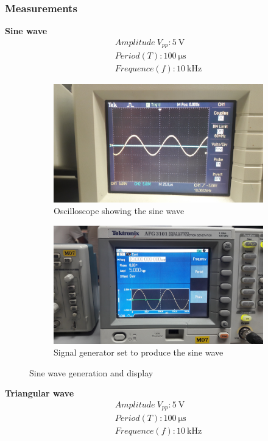 \documentclass[letterpaper]{article}
\begin{document}
\subsubsection{Measurements}
{\textbf{Sine wave}}
\begin{gather*}
    Amplitude\ V_{pp}: \SI{5}{\volt}\\
    Period(T): \SI{100}{\micro\second}\\
    Frequence(f): \SI{10}{\kilo\hertz}
\end{gather*}
\begin{figure}[H]
    \begin{subfigure}{0.55\textwidth}
        \includegraphics[width=.95\linewidth]{img/part2/1}
        \caption{Oscilloscope showing the sine wave}
    \end{subfigure}
    \begin{subfigure}{0.55\textwidth}
        \includegraphics[width=.95\linewidth]{img/part2/2}
        \caption{Signal generator set to produce the sine wave}
    \end{subfigure}
    \caption{Sine wave generation and display}
\end{figure}
{\textbf{Triangular wave}}
\begin{gather*}
    Amplitude\ V_{pp}: \SI{5}{\volt}\\
    Period(T): \SI{100}{\micro\second}\\
    Frequence(f): \SI{10}{\kilo\hertz}
\end{gather*}
\end{document}
